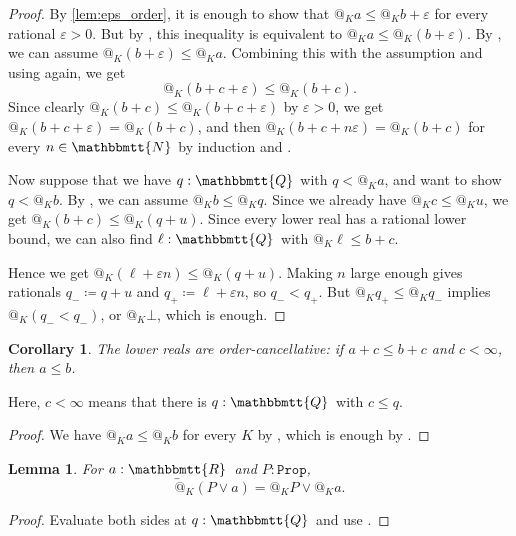 \documentclass[11pt, oneside, article]{memoir}
\makeatletter
\theoremstyle{plain}
\newtheorem{corollary}[theorem]{Corollary}
\newtheorem{lemma}[theorem]{Lemma}
\theoremstyle{definition}
\theoremstyle{remark}
\newcommand{\const}[1]{\mathtt{#1}}
\newcommand{\ubar}[1]{\underaccent{\bar}{#1}}
\newcommand{\internal}[1]{\raisebox{-.03ex}{$\mathbbmtt{#1}$}}
\newcommand{\hs}{\hspace{1.1pt}}
\newcommand{\tNN}{\internal{N}\hs}
\newcommand{\tQQ}{\internal{Q}\hs}
\newcommand{\tRR}{\internal{R}\hs}
\newcommand{\tLR}{\ubar{\tRR}\hs}
\newcommand{\Prop}{\const{Prop}}
\newcommand{\AtSymbol}{{@}}
\newcommand{\At}[2][]{\AtSymbol^{#1}_{#2}}
\makeatother
\begin{document}
\begin{proof}
	By \cref{lem:eps_order}, it is enough to show that $\At{K} a \leq \At{K} b + \varepsilon$ for every rational $\varepsilon > 0$. But by , this inequality is equivalent to $\At{K} a \leq \At{K}(b + \varepsilon)$. By , we can assume $\At{K}(b+\varepsilon) \leq \At{K} a$. Combining this with the assumption and using  again, we get
	\[
		\At{K}(b + c + \varepsilon) \leq \At{K}(b + c).
	\]
	Since clearly $\At{K}(b + c) \leq \At{K}(b + c + \varepsilon)$ by $\varepsilon > 0$, we get $\At{K}(b + c + \varepsilon) = \At{K}(b + c)$, and then $\At{K}(b + c + n\varepsilon) = \At{K}(b + c)$ for every $n \in \tNN$ by induction and .

	Now suppose that we have $q : \tQQ$ with $q < \At{K}a$, and want to show $q < \At{K}b$. By , we can assume $\At{K} b \leq \At{K} q$. Since we already have $\At{K} c \leq \At{K} u$, we get $\At{K}(b + c) \leq \At{K}(q + u)$. Since every lower real has a rational lower bound, we can also find $\ell : \tQQ$ with $\At{K} \ell \leq b + c$.

	Hence we get $\At{K}(\ell + \varepsilon n) \leq \At{K}(q + u)$. Making $n$ large enough gives rationals $q_-\coloneqq q+u$ and $q_+\coloneqq \ell+\varepsilon n$, so $q_- < q_+$. But $\At{K} q_+ \leq \At{K} q_-$ implies $\At{K}(q_- < q_-)$, or $\At{K}\bot$, which is enough.
\end{proof}

\begin{corollary}\label{cor.order_canc}
The lower reals are order-cancellative: if $a+c\leq b+c$ and $c < \infty$, then $a\leq b$.
\end{corollary}

Here, $c < \infty$ means that there is $q : \tQQ$ with $c \leq q$. 

\begin{proof}
	We have $\At{K} a \leq \At{K} b$ for every $K$ by , which is enough by .
\end{proof}

\begin{lemma}
	\label{lem.at_vs_or_LR}
	For $a : \tLR$ and $P : \Prop$,
	\[
		\At{K}(P \lor a) = \At{K}P \lor \At{K} a.
	\]
\end{lemma}

\begin{proof}
	Evaluate both sides at $q : \tQQ$ and use .
\end{proof}
\end{document}
